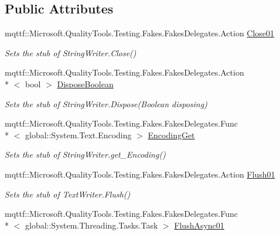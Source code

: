 \subsection*{Public Attributes}
\begin{DoxyCompactItemize}
\item 
mqttf\-::\-Microsoft.\-Quality\-Tools.\-Testing.\-Fakes.\-Fakes\-Delegates.\-Action \hyperlink{class_system_1_1_i_o_1_1_fakes_1_1_stub_string_writer_a15d5307e0a6bc2260f2bf0e2f65edea5}{Close01}
\begin{DoxyCompactList}\small\item\em Sets the stub of String\-Writer.\-Close()\end{DoxyCompactList}\item 
mqttf\-::\-Microsoft.\-Quality\-Tools.\-Testing.\-Fakes.\-Fakes\-Delegates.\-Action\\*
$<$ bool $>$ \hyperlink{class_system_1_1_i_o_1_1_fakes_1_1_stub_string_writer_a725e75ba6d004b5d83b5cede1ec0a65a}{Dispose\-Boolean}
\begin{DoxyCompactList}\small\item\em Sets the stub of String\-Writer.\-Dispose(\-Boolean disposing)\end{DoxyCompactList}\item 
mqttf\-::\-Microsoft.\-Quality\-Tools.\-Testing.\-Fakes.\-Fakes\-Delegates.\-Func\\*
$<$ global\-::\-System.\-Text.\-Encoding $>$ \hyperlink{class_system_1_1_i_o_1_1_fakes_1_1_stub_string_writer_af6bc1f8dd0a06cb1bb18bb0a2954bfe3}{Encoding\-Get}
\begin{DoxyCompactList}\small\item\em Sets the stub of String\-Writer.\-get\-\_\-\-Encoding()\end{DoxyCompactList}\item 
mqttf\-::\-Microsoft.\-Quality\-Tools.\-Testing.\-Fakes.\-Fakes\-Delegates.\-Action \hyperlink{class_system_1_1_i_o_1_1_fakes_1_1_stub_string_writer_ad4edba51a5a35cbdb768a49d4ad7a645}{Flush01}
\begin{DoxyCompactList}\small\item\em Sets the stub of Text\-Writer.\-Flush()\end{DoxyCompactList}\item 
mqttf\-::\-Microsoft.\-Quality\-Tools.\-Testing.\-Fakes.\-Fakes\-Delegates.\-Func\\*
$<$ global\-::\-System.\-Threading.\-Tasks.\-Task $>$ \hyperlink{class_system_1_1_i_o_1_1_fakes_1_1_stub_string_writer_ac38954429488bde1f2f2dca56f1ff1db}{Flush\-Async01}

\end{DoxyCompactItemize}
